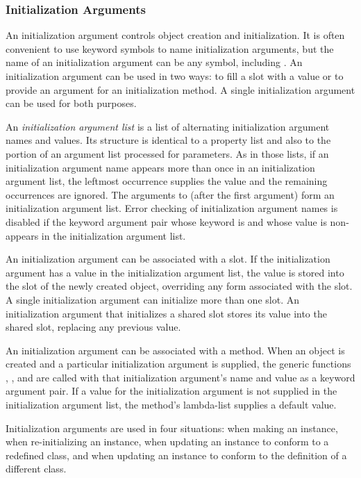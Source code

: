 \subsubsection{Initialization Arguments}

An initialization argument controls object creation and
initialization.  It is often convenient to use keyword symbols to name
initialization arguments, but the name of an initialization argument
can be any symbol, including .  An initialization argument
can be used in two ways: to fill a slot with a value or to provide an
argument for an initialization method.  A single initialization
argument can be used for both purposes.

An \emph{initialization argument list\/} is a list of alternating
initialization argument names and values.  Its structure is identical
to a property list and also to the portion of an argument list
processed for  parameters.  As in those lists, if an
initialization argument name appears more than once in an
initialization argument list, the leftmost occurrence supplies the
value and the remaining occurrences are ignored.  The arguments to
 (after the first argument) form an initialization
argument list.  Error checking of initialization argument names is
disabled if the keyword argument pair whose keyword is 
 and whose value is non- appears in the
initialization argument list.

An initialization argument can be associated with a slot.  If the
initialization argument has a value in the initialization argument
list, the value is stored into the slot of the newly created object,
overriding any  form associated with the slot.  A
single initialization argument can initialize more than one slot.  An
initialization argument that initializes a shared slot stores its
value into the shared slot, replacing any previous value.

An initialization argument can be associated with a method.  When an
object is created and a particular initialization argument is
supplied, the generic functions , 
, and  are called with that
initialization argument's name and value as a keyword argument pair.
If a value for the initialization argument is not supplied in the
initialization argument list, the method's lambda-list supplies a
default value.

Initialization arguments are used in four situations: when making an
instance, when re-initializing an instance, when updating an instance to
conform to a redefined class, and when updating an instance to conform
to the definition of a different class.

